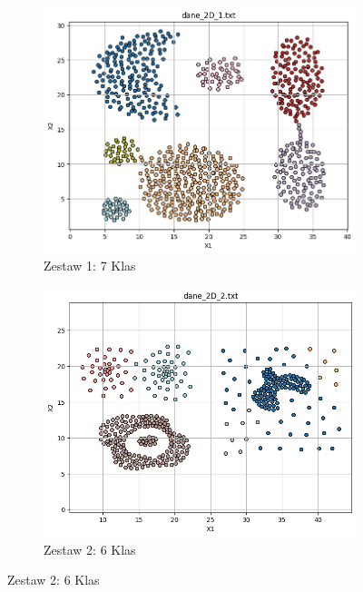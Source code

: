 \documentclass[polish,12pt,a4paper]{extarticle}
\begin{document}
\begin{figure}[h!]
    \centering

    \begin{subfigure}[b]{0.30\textwidth}
        \includegraphics[width=\linewidth]{img/hierarchical/centroid/data1.png}
        \captionsetup{labelformat=empty}
        \caption{Zestaw 1: 7 Klas}
    \end{subfigure}
    \hfill
    \begin{subfigure}[b]{0.30\textwidth}
        \includegraphics[width=\linewidth]{img/hierarchical/centroid/data2.png}
        \captionsetup{labelformat=empty}
        \caption{Zestaw 2: 6 Klas}

\end{subfigure}
\end{figure}
\end{document}
